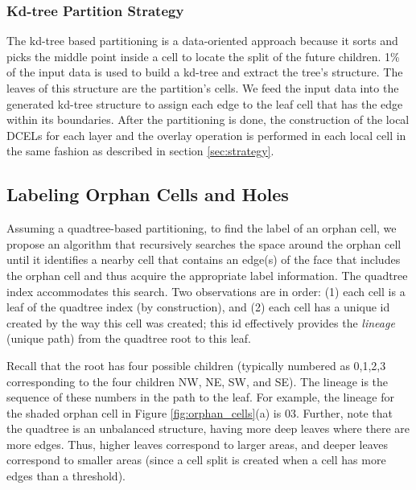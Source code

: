 \subsubsection{Kd-tree Partition Strategy} \label{sec:kdtreestrategy}

The kd-tree based partitioning is a data-oriented approach because it sorts and picks the middle point inside a cell to locate the split of the future children. 1\% of the input data is used to build a kd-tree and extract the tree's structure.  The leaves of this structure are the partition's cells.  We feed the input data into the generated kd-tree structure to assign each edge to the leaf cell that has the edge within its boundaries.  After the partitioning is done, the construction of the local DCELs for each layer and the overlay operation is performed in each local cell in the same fashion as described in section \ref{sec:strategy}. 


\subsection{Labeling Orphan Cells and Holes} \label{sec:anomalies}
Assuming a quadtree-based partitioning, to find the label of an orphan cell, we propose an algorithm that recursively searches the space around the orphan cell
until it identifies a nearby cell that contains an edge(s) of the face that includes the orphan cell and thus acquire the appropriate label information. The 
quadtree index accommodates this search. Two observations are in order: (1) each cell is a leaf of the quadtree index (by construction), and (2) each cell has a 
unique id created by the way this cell was created; this id effectively provides the \textit{lineage} (unique path) from the quadtree root to this leaf.

Recall that the root has four possible children (typically numbered as 0,1,2,3 corresponding to the four children NW, NE, SW, and SE). The lineage is the 
sequence of these numbers in the path to the leaf. For example, the lineage for the shaded orphan cell in Figure \ref{fig:orphan_cells}(a) is 03. Further, note 
that the quadtree is an unbalanced structure, having more deep leaves where there are more edges. Thus, higher leaves correspond to larger areas, and deeper 
leaves correspond to smaller areas (since a cell split is created when a cell has more edges than a threshold).

